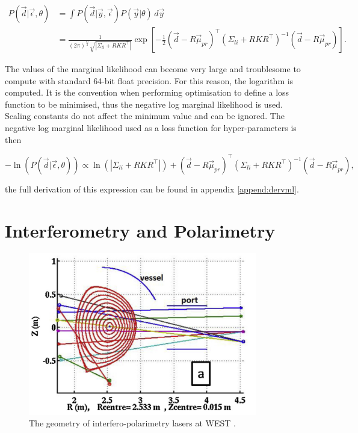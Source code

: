\begin{equation}
\begin{aligned}
 P(\vec d|\vec\epsilon,\theta) &= \int P(\vec{d}|\vec{y},\vec\epsilon)P(\vec{y}|\theta)  \, d\vec y \\
 &= \frac{1}{(2\pi)^{\frac{m}{2}} \sqrt{|\Sigma_{li} + RKR^\top|}} \exp\left[ -\frac{1}{2} (\vec{d} - R\vec{\mu}_{pr})^{\top} (\Sigma_{li} + R K R^{\top})^{-1} (\vec{d} - R\vec{\mu}_{pr}) \right].
\end{aligned}
\end{equation}

\noindent The values of the marginal likelihood can become very large and troublesome to compute with standard 64-bit float precision. For this reason, the logarithm is computed. It is the convention when performing optimisation to define a loss function to be minimised, thus the negative log marginal likelihood is used. Scaling constants do not affect the minimum value and can be ignored. The negative log marginal likelihood used as a loss function for hyper-parameters is then 

\begin{equation}
-\ln(P(\vec d| \vec \epsilon,\theta)) \propto \ln(|\Sigma_{li}+RKR^\top|) +  (\vec{d} - R\vec{\mu}_{pr})^{\top} (\Sigma_{li} + R K R^{\top})^{-1} (\vec{d} - R\vec{\mu}_{pr}),
\end{equation}

\noindent the full derivation of this expression can be found in appendix \ref{append:dervml}.


\section{Interferometry and Polarimetry}

\begin{figure}[H]
  \centering
  \includegraphics[width=10cm]{images/interfgeo.png}
  \caption{The geometry of interfero-polarimetry lasers at WEST \cite{westinterfero}.}
  \label{fig:interfgeo}
\end{figure}

